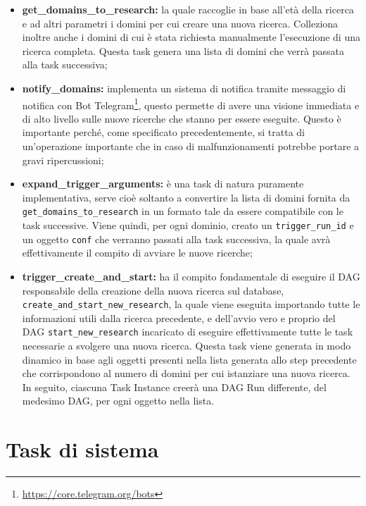 \begin{itemize}
  \item \textbf{get\_domains\_to\_research:} la quale raccoglie in base all'età
    della ricerca e ad altri parametri i domini per cui creare una nuova ricerca.
    Colleziona inoltre anche i domini di cui è stata richiesta manualmente l'esecuzione
    di una ricerca completa. Questa task genera una lista di domini che verrà
    passata alla task successiva;

  \item \textbf{notify\_domains:} implementa un sistema di notifica tramite
    messaggio di notifica con Bot Telegram\footnote{\url{https://core.telegram.org/bots}},
    questo permette di avere una visione immediata e di alto livello sulle nuove
    ricerche che stanno per essere eseguite. Questo è importante perché, come
    specificato precedentemente, si tratta di un'operazione importante che in caso
    di malfunzionamenti potrebbe portare a gravi ripercussioni;

  \item \textbf{expand\_trigger\_arguments:} è una task di natura puramente
    implementativa, serve cioè soltanto a convertire la lista di domini fornita da
    \texttt{get\_domains\_to\_research} in un formato tale da essere compatibile
    con le task successive. Viene quindi, per ogni dominio, creato un \texttt{trigger\_run\_id}
    e un oggetto \texttt{conf} che verranno passati alla task successiva, la
    quale avrà effettivamente il compito di avviare le nuove ricerche;

  \item \textbf{trigger\_create\_and\_start:} ha il compito fondamentale di
    eseguire il DAG responsabile della creazione della nuova ricerca sul
    database, \texttt{create\_and\_start\_new\_research}, la quale viene eseguita
    importando tutte le informazioni utili dalla ricerca precedente, e dell'avvio
    vero e proprio del DAG \texttt{start\_new\_research} incaricato di eseguire effettivamente
    tutte le task necessarie a svolgere una nuova ricerca. Questa task viene
    generata in modo dinamico in base agli oggetti presenti nella lista generata
    allo step precedente che corrispondono al numero di domini per cui
    istanziare una nuova ricerca. In seguito, ciascuna Task Instance creerà una
    DAG Run differente, del medesimo DAG, per ogni oggetto nella lista.
\end{itemize}

\section{Task di sistema}
\label{sec:sistema}


